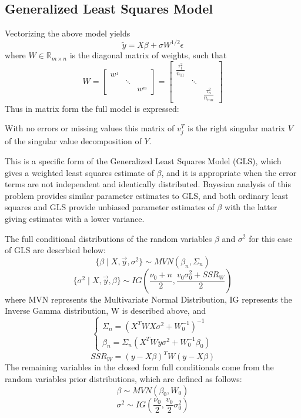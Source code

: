 \documentclass[12pt,twoside]{dukestatscithesis}
\theoremstyle{definition}
\theoremstyle{definition}
\theoremstyle{definition}
\theoremstyle{remark}
\begin{document}
\subsection{Generalized Least Squares
Model}\label{generalized-least-squares-model}

Vectorizing the above model yields
\[\tilde{y} = X\beta + \sigma W^{1/2} \epsilon\] where
\(W \in \mathbb{R}_{m \times n}\) is the diagonal matrix of weights,
such that \[
  W =
  \begin{bmatrix}
    w^_{1} & & \\
    & \ddots & \\
    & & w^_{m}
  \end{bmatrix} 
  = \begin{bmatrix}
    \frac{\tau_1^2}{n_{11}} & & \\
    & \ddots & \\
    & & \frac{\tau_n^2}{n_{mn}}
  \end{bmatrix}\]
Thus in matrix form the full model is expressed:

With no errors or missing values this matrix of \(v_j^T\) is the right
singular matrix \(V\) of the singular value decomposition of \(Y\).

This is a specific form of the Generalized Least Squares Model (GLS),
which gives a weighted least squares estimate of \(\beta\), and it is
appropriate when the error terms are not independent and identically
distributed. Bayesian analysis of this problem provides similar
parameter estimates to GLS, and both ordinary least squares and GLS
provide unbiased parameter estimates of \(\beta\) with the latter giving
estimates with a lower variance.

The full conditional distributions of the random variables \(\beta\) and
\(\sigma^2\) for this case of GLS are descrbied below:
\[\{\beta \mid X, \vec{y}, \sigma^2\} \sim MVN (\beta_n, \Sigma_n)\]
\[\{\sigma^2 \mid X, \vec{y}, \beta\} \sim IG (\frac{\nu_0 + n}{2}, \frac{v_0\sigma^2_0 + SSR_W}{2})\]
where MVN represents the Multivariate Normal Distribution, IG represents
the Inverse Gamma distribution, W is described above, and
\[ \begin{cases}
      \Sigma_n = (X^TWX\sigma^2+W_0^{-1})^{-1}\\
      \beta_n = \Sigma_n(X^TWy\sigma^2 + W_0^{-1} \beta_0)
    \end{cases}\] \[SSR_W = (y - X\beta)^TW(y-X\beta)\]
The remaining variables in the closed form full conditionals come from
the random variables prior distributions, which are defined as follows:
\[\beta \sim MVN (\beta_0, W_0)\]
\[\sigma^2 \sim IG (\frac{\nu_0}{2}, \frac{v_0}{2}\sigma_0^2)\]
\end{document}
